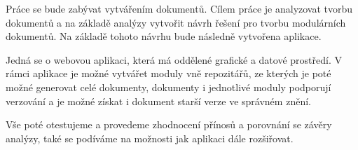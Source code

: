 Práce se bude zabývat vytvářením dokumentů. Cílem práce je analyzovat tvorbu dokumentů a na základě analýzy vytvořit návrh řešení pro tvorbu
modulárních dokumentů. Na základě tohoto návrhu bude následně vytvořena aplikace.

Jedná se o webovou aplikaci, která má oddělené grafické a datové prostředí.
V rámci aplikace je možné vytvářet moduly vně repozitářů, ze kterých je poté možné generovat celé dokumenty, dokumenty i jednotlivé moduly podporují verzování
a je možné získat i dokument starší verze ve správném znění.

Vše poté otestujeme a provedeme zhodnocení přínosů a porovnání se závěry analýzy, také se podíváme na možnosti jak aplikaci dále rozšiřovat.